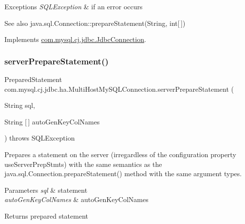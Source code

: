 \begin{DoxyExceptions}{Exceptions}
{\em S\+Q\+L\+Exception} & if an error occurs \\
\hline
\end{DoxyExceptions}
\begin{DoxySeeAlso}{See also}
java.\+sql.\+Connection\+::prepare\+Statement(\+String, int\mbox{[}$\,$\mbox{]}) 
\end{DoxySeeAlso}


Implements \mbox{\hyperlink{interfacecom_1_1mysql_1_1cj_1_1jdbc_1_1_jdbc_connection_aefdad3d71436ba1c80d2cb1e8419dfba}{com.\+mysql.\+cj.\+jdbc.\+Jdbc\+Connection}}.

\mbox{\label{classcom_1_1mysql_1_1cj_1_1jdbc_1_1ha_1_1_multi_host_my_s_q_l_connection_ae0fc18db059bf9625bc8741334de6eef}} 
\subsubsection{\texorpdfstring{server\+Prepare\+Statement()}{serverPrepareStatement()}\hspace{0.1cm}{\footnotesize\ttfamily [5/6]}}
{\footnotesize\ttfamily Prepared\+Statement com.\+mysql.\+cj.\+jdbc.\+ha.\+Multi\+Host\+My\+S\+Q\+L\+Connection.\+server\+Prepare\+Statement (\begin{DoxyParamCaption}\item[{String}]{sql,  }\item[{String \mbox{[}$\,$\mbox{]}}]{auto\+Gen\+Key\+Col\+Names }\end{DoxyParamCaption}) throws S\+Q\+L\+Exception}

Prepares a statement on the server (irregardless of the configuration property \textquotesingle{}use\+Server\+Prep\+Stmts\textquotesingle{}) with the same semantics as the java.\+sql.\+Connection.\+prepare\+Statement() method with the same argument types.


\begin{DoxyParams}{Parameters}
{\em sql} & statement \\
\hline
{\em auto\+Gen\+Key\+Col\+Names} & auto\+Gen\+Key\+Col\+Names \\
\hline
\end{DoxyParams}
\begin{DoxyReturn}{Returns}
prepared statement 
\end{DoxyReturn}

